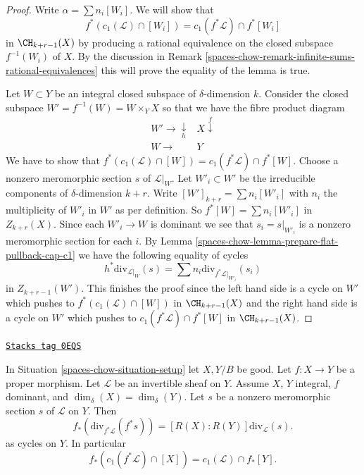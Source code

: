 \begin{proof}
Write $\alpha = \sum n_i[W_i]$. We will show that
$$
f^*(c_1(\mathcal{L}) \cap [W_i]) = c_1(f^*\mathcal{L}) \cap f^*[W_i]
$$
in $\CH_{k + r - 1}(X)$ by producing a rational equivalence
on the closed subspace $f^{-1}(W_i)$ of $X$.
By the discussion in
Remark \ref{spaces-chow-remark-infinite-sums-rational-equivalences}
this will prove the equality of the lemma is true.

\medskip\noindent
Let $W \subset Y$ be an integral closed subspace of $\delta$-dimension $k$.
Consider the closed subspace $W' = f^{-1}(W) = W \times_Y X$
so that we have the fibre product diagram
$$
\begin{array}{cc}W' \longrightarrow\underset{h}{\downarrow} & X \overset{f}{\downarrow} \\ W \longrightarrow & Y\end{array}
$$
We have to show that
$f^*(c_1(\mathcal{L}) \cap [W]) = c_1(f^*\mathcal{L}) \cap f^*[W]$.
Choose a nonzero meromorphic section $s$ of $\mathcal{L}|_W$.
Let $W'_i \subset W'$ be the irreducible components of
$\delta$-dimension $k + r$. Write $[W']_{k + r} = \sum n_i[W'_i]$
with $n_i$ the multiplicity of $W'_i$ in $W'$ as per definition.
So $f^*[W] = \sum n_i[W'_i]$ in $Z_{k + r}(X)$.
Since each $W'_i \to W$ is dominant we
see that $s_i = s|_{W'_i}$ is a nonzero meromorphic section for
each $i$. By Lemma \ref{spaces-chow-lemma-prepare-flat-pullback-cap-c1}
we have the following equality of cycles
$$
h^*\text{div}_{\mathcal{L}|_W}(s) =
\sum n_i\text{div}_{f^*\mathcal{L}|_{W'_i}}(s_i)
$$
in $Z_{k + r - 1}(W')$. This finishes the proof since
the left hand side is a cycle on $W'$ which pushes to
$f^*(c_1(\mathcal{L}) \cap [W])$ in $\CH_{k + r - 1}(X)$
and the right hand side is a cycle on $W'$ which pushes to
$c_1(f^*\mathcal{L}) \cap f^*[W]$ in $\CH_{k + r - 1}(X)$.
\end{proof}

\begin{lemma}
\label{spaces-chow-lemma-equal-c1-as-cycles}
\href{https://stacks.math.columbia.edu/tag/0EQS}{\texttt{Stacks tag 0EQS}}

In Situation \ref{spaces-chow-situation-setup} let $X, Y/B$ be good.
Let $f : X \to Y$ be a proper morphism.
Let $\mathcal{L}$ be an invertible sheaf on $Y$.
Assume $X$, $Y$ integral, $f$ dominant, and $\dim_\delta(X) = \dim_\delta(Y)$.
Let $s$ be a nonzero meromorphic section $s$ of $\mathcal{L}$ on $Y$.
Then
$$
f_*\left(\text{div}_{f^*\mathcal{L}}(f^*s)\right) =
[R(X) : R(Y)]\text{div}_\mathcal{L}(s).
$$
as cycles on $Y$. In particular
$$
f_*(c_1(f^*\mathcal{L}) \cap [X]) = c_1(\mathcal{L}) \cap f_*[Y].
$$
\end{lemma}

